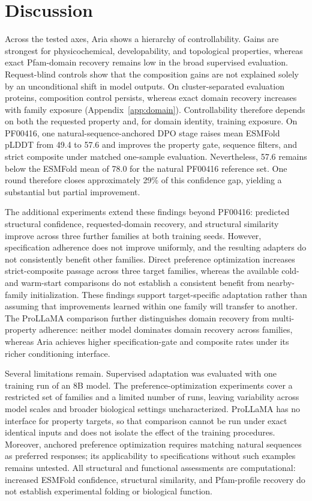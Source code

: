 \documentclass{article} %
\begin{document}
\section{Discussion}
Across the tested axes, Aria shows a hierarchy of controllability. Gains are strongest for physicochemical, developability, and topological properties, whereas exact Pfam-domain recovery remains low in the broad supervised evaluation. Request-blind controls show that the composition gains are not explained solely by an unconditional shift in model outputs. On cluster-separated evaluation proteins, composition control persists, whereas exact domain recovery increases with family exposure (Appendix~\ref{app:domain}). Controllability therefore depends on both the requested property and, for domain identity, training exposure. On PF00416, one natural-sequence-anchored DPO stage raises mean ESMFold pLDDT from 49.4 to 57.6 and improves the property gate, sequence filters, and strict composite under matched one-sample evaluation. Nevertheless, 57.6 remains below the ESMFold mean of 78.0 for the natural PF00416 reference set. One round therefore closes approximately 29\% of this confidence gap, yielding a substantial but partial improvement.

The additional experiments extend these findings beyond PF00416: predicted structural confidence, requested-domain recovery, and structural similarity improve across three further families at both training seeds. However, specification adherence does not improve uniformly, and the resulting adapters do not consistently benefit other families. Direct preference optimization increases strict-composite passage across three target families, whereas the available cold- and warm-start comparisons do not establish a consistent benefit from nearby-family initialization. These findings support target-specific adaptation rather than assuming that improvements learned within one family will transfer to another. The ProLLaMA comparison further distinguishes domain recovery from multi-property adherence: neither model dominates domain recovery across families, whereas Aria achieves higher specification-gate and composite rates under its richer conditioning interface.

Several limitations remain. Supervised adaptation was evaluated with one training run of an 8B model. The preference-optimization experiments cover a restricted set of families and a limited number of runs, leaving variability across model scales and broader biological settings uncharacterized. ProLLaMA has no interface for property targets, so that comparison cannot be run under exact identical inputs and does not isolate the effect of the training procedures. Moreover, anchored preference optimization requires matching natural sequences as preferred responses; its applicability to specifications without such examples remains untested. All structural and functional assessments are computational: increased ESMFold confidence, structural similarity, and Pfam-profile recovery do not establish experimental folding or biological function. 
\end{document}
